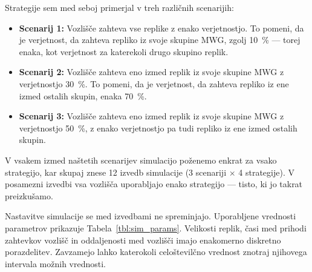 \documentclass[a4paper, 12pt]{book}
\begin{document}
Strategije sem med seboj primerjal v treh različnih scenarijih:
\begin{itemize}
  \item \textbf{Scenarij 1:} Vozlišče zahteva vse replike z
    enako verjetnostjo. To pomeni, da je verjetnost, da zahteva repliko iz
    svoje skupine MWG, zgolj 10~\% --- torej enaka, kot verjetnost za
    katerekoli drugo skupino replik.

  \item \textbf{Scenarij 2:} Vozlišče zahteva eno izmed replik iz svoje
    skupine MWG z verjetnostjo 30~\%. To pomeni, da je verjetnost, da
    zahteva repliko iz ene izmed ostalih skupin, enaka 70~\%.

  \item \textbf{Scenarij 3:} Vozlišče zahteva eno izmed replik iz svoje
    skupine MWG z verjetnostjo 50~\%, z enako verjetnostjo pa tudi repliko
    iz ene izmed ostalih skupin.
\end{itemize}
V vsakem izmed naštetih scenarijev simulacijo poženemo enkrat za vsako
strategijo, kar skupaj znese 12 izvedb simulacije
(3 scenariji $\times$ 4 strategije). V posamezni izvedbi vsa vozlišča
uporabljajo enako strategijo --- tisto, ki jo takrat preizkušamo.

Nastavitve simulacije se med izvedbami ne spreminjajo. Uporabljene vrednosti
parametrov prikazuje Tabela~\ref{tbl:sim_params}.
Velikosti replik, časi med prihodi zahtevkov vozlišč in oddaljenosti med
vozlišči imajo enakomerno diskretno porazdelitev. Zavzamejo lahko katerokoli
celoštevilčno vrednost znotraj njihovega intervala možnih vrednosti.
\end{document}
